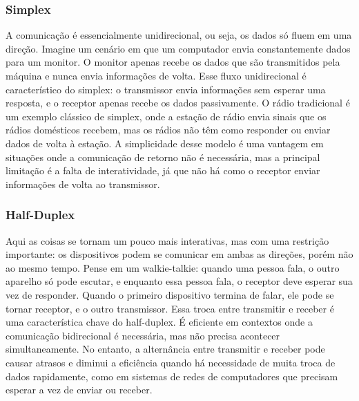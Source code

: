 \documentclass[12pt]{article}
\begin{document}
\subsubsection{Simplex}
A comunicação é essencialmente unidirecional, ou seja, os dados só fluem em uma direção. Imagine um cenário em que um computador envia constantemente dados para um monitor. O monitor apenas recebe os dados que são transmitidos pela máquina e nunca envia informações de volta. Esse fluxo unidirecional é característico do simplex: o transmissor envia informações sem esperar uma resposta, e o receptor apenas recebe os dados passivamente. O rádio tradicional é um exemplo clássico de simplex, onde a estação de rádio envia sinais que os rádios domésticos recebem, mas os rádios não têm como responder ou enviar dados de volta à estação. A simplicidade desse modelo é uma vantagem em situações onde a comunicação de retorno não é necessária, mas a principal limitação é a falta de interatividade, já que não há como o receptor enviar informações de volta ao transmissor. \cite{galvao2024}

\subsubsection{Half-Duplex}
Aqui as coisas se tornam um pouco mais interativas, mas com uma restrição importante: os dispositivos podem se comunicar em ambas as direções, porém não ao mesmo tempo. Pense em um walkie-talkie: quando uma pessoa fala, o outro aparelho só pode escutar, e enquanto essa pessoa fala, o receptor deve esperar sua vez de responder. Quando o primeiro dispositivo termina de falar, ele pode se tornar receptor, e o outro transmissor. Essa troca entre transmitir e receber é uma característica chave do half-duplex. É eficiente em contextos onde a comunicação bidirecional é necessária, mas não precisa acontecer simultaneamente. No entanto, a alternância entre transmitir e receber pode causar atrasos e diminui a eficiência quando há necessidade de muita troca de dados rapidamente, como em sistemas de redes de computadores que precisam esperar a vez de enviar ou receber. \cite{galvao2024}
\end{document}
